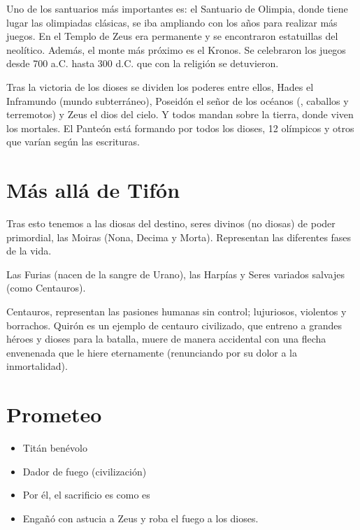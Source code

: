 Uno de los santuarios más importantes es: el Santuario de Olimpia, donde tiene lugar las olimpiadas clásicas, se iba ampliando con los años para realizar más juegos. En el Templo de Zeus era permanente y se encontraron estatuillas del neolítico. Además, el monte más próximo es el Kronos. Se celebraron los juegos desde 700 a.C. hasta 300 d.C. que con la religión se detuvieron.

Tras la victoria de los dioses se dividen los poderes entre ellos, Hades el Inframundo (mundo subterráneo), Poseidón el señor de los océanos (, caballos y terremotos) y Zeus el dios del cielo. Y todos mandan sobre la tierra, donde viven los mortales.
El Panteón está formando por todos los dioses, 12 olímpicos y otros que varían según las escrituras.

\section{Más allá de Tifón}
Tras esto tenemos a las diosas del destino, seres divinos (no diosas) de poder primordial, las Moiras (Nona, Decima y Morta). Representan las diferentes fases de la vida.

Las Furias (nacen de la sangre de Urano), las Harpías y Seres variados salvajes (como Centauros).

Centauros, representan las pasiones humanas sin control; lujuriosos, violentos y borrachos. Quirón es un ejemplo de centauro civilizado, que entreno a grandes héroes y dioses para la batalla, muere de manera accidental con una flecha envenenada que le hiere eternamente (renunciando por su dolor a la inmortalidad).

\section{Prometeo}
\begin{itemize}
    \item Titán benévolo
    \item Dador de fuego (civilización)
    \item Por él, el sacrificio es como es 
    \item Engañó con astucia a Zeus y roba el fuego a los dioses.
\end{itemize}

